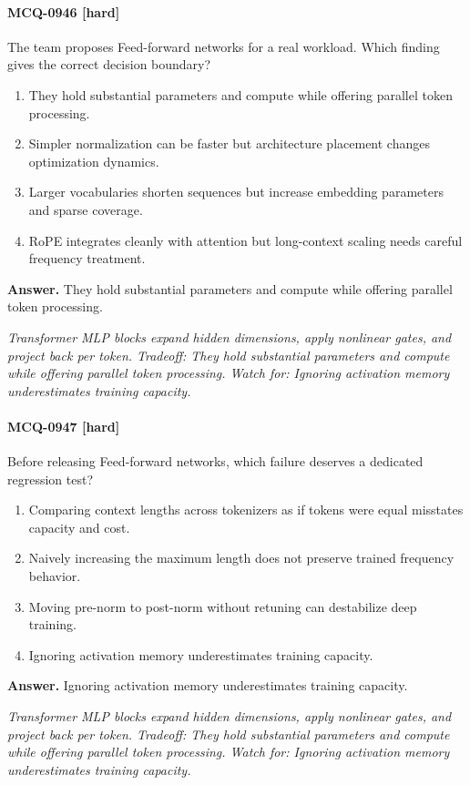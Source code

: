 \paragraph{MCQ-0946 [hard]} The team proposes Feed-forward networks for a real workload. Which finding gives the correct decision boundary?
\begin{enumerate}[label=\Alph*.]
\item They hold substantial parameters and compute while offering parallel token processing.
\item Simpler normalization can be faster but architecture placement changes optimization dynamics.
\item Larger vocabularies shorten sequences but increase embedding parameters and sparse coverage.
\item RoPE integrates cleanly with attention but long-context scaling needs careful frequency treatment.
\end{enumerate}
\noindent\textbf{Answer.} They hold substantial parameters and compute while offering parallel token processing.
\par\textit{Transformer MLP blocks expand hidden dimensions, apply nonlinear gates, and project back per token. Tradeoff: They hold substantial parameters and compute while offering parallel token processing. Watch for: Ignoring activation memory underestimates training capacity.}
\paragraph{MCQ-0947 [hard]} Before releasing Feed-forward networks, which failure deserves a dedicated regression test?
\begin{enumerate}[label=\Alph*.]
\item Comparing context lengths across tokenizers as if tokens were equal misstates capacity and cost.
\item Naively increasing the maximum length does not preserve trained frequency behavior.
\item Moving pre-norm to post-norm without retuning can destabilize deep training.
\item Ignoring activation memory underestimates training capacity.
\end{enumerate}
\noindent\textbf{Answer.} Ignoring activation memory underestimates training capacity.
\par\textit{Transformer MLP blocks expand hidden dimensions, apply nonlinear gates, and project back per token. Tradeoff: They hold substantial parameters and compute while offering parallel token processing. Watch for: Ignoring activation memory underestimates training capacity.}
